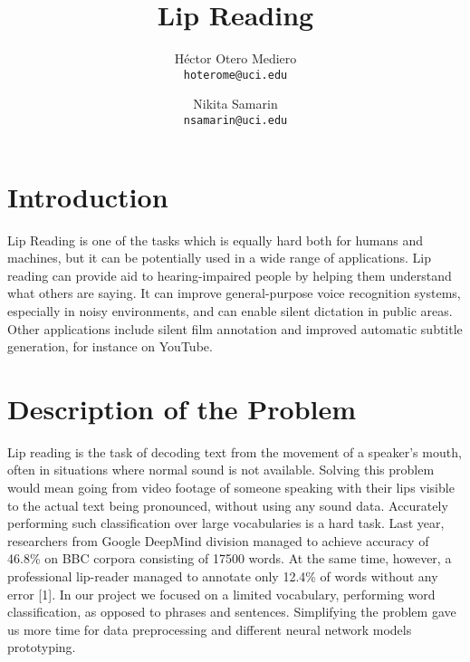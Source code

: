 \documentclass{article}[10pt]
\author{
  Héctor Otero Mediero\\      \texttt{hoterome@uci.edu}
  \and
  Nikita Samarin\\      \texttt{nsamarin@uci.edu}
}
\title{Lip Reading}
\begin{document}
\maketitle

\begin{multicols}{2}

\section{Introduction}
Lip Reading is one of the tasks which is equally hard both for humans and machines,
but it can be potentially used in a wide range of applications. Lip reading can
provide aid to hearing-impaired people by helping them understand what others are
saying. It can improve general-purpose voice recognition systems, especially in
noisy environments, and can enable silent dictation in public areas. Other
applications include silent film annotation and improved automatic subtitle
generation, for instance on YouTube.
\section{Description of the Problem}
Lip reading is the task of decoding text from the movement of a speaker’s mouth,
often in situations where normal sound is not available. Solving this problem
would mean going from video footage of someone speaking with their lips visible
to the actual text being pronounced, without using any sound data. Accurately
performing such classification over large vocabularies is a hard task.
Last year, researchers from Google DeepMind division managed to achieve accuracy
of 46.8\% on BBC corpora consisting of 17500 words. At the same time, however,
a professional lip-reader managed to annotate only 12.4\% of words without any error [1].
In our project we focused on a limited vocabulary, performing word classification,
as opposed to phrases and sentences. Simplifying the problem gave us more time
for data preprocessing and different neural network models prototyping.

\end{multicols}
\end{document}
